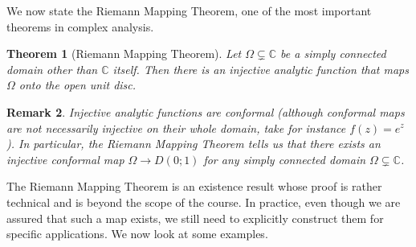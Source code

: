 \documentclass[10pt]{article}
\newcommand{\C}{\mathbb{C}}
\theoremstyle{newstyle}
\newtheorem{thm}{Theorem}[section]
\newtheorem{remark}[thm]{Remark}
\begin{document}
We now state the Riemann Mapping Theorem, one of the most important theorems in complex analysis.

\begin{thm}[Riemann Mapping Theorem]
Let $\Omega \subsetneq \C$ be a simply connected domain other than $\C$ itself. Then there is an injective
analytic function that maps $\Omega$ onto the open unit disc. 
\end{thm}

\begin{remark}
Injective analytic functions are conformal (although conformal maps are not necessarily injective 
on their whole domain, take for instance $f(z) = e^z$). In particular, the Riemann Mapping 
Theorem tells us that there exists an injective conformal map $\Omega \to D(0; 1)$ for 
any simply connected domain $\Omega \subsetneq \C$. 
\end{remark}

The Riemann Mapping Theorem is an existence result whose proof is rather technical and 
is beyond the scope of the course. In practice, even though we are assured that such a 
map exists, we still need to explicitly construct them for specific applications. 
We now look at some examples.
\end{document}
